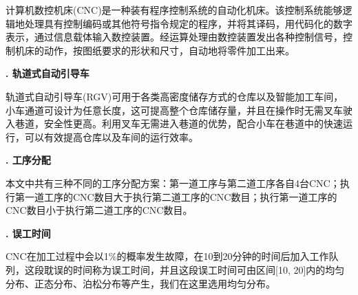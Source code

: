 \documentclass[no-math,withoutpreface,bwprint]{cumcmthesis} %
\numberwithin{equation}{section}
\numberwithin{figure}{section}
\numberwithin{table}{section}
\begin{document}
计算机数控机床(CNC)是一种装有程序控制系统的自动化机床。该控制系统能够逻辑地处理具有控制编码或其他符号指令规定的程序，并将其译码，用代码化的数字表示，通过信息载体输入数控装置。经运算处理由数控装置发出各种控制信号，控制机床的动作，按图纸要求的形状和尺寸，自动地将零件加工出来。

{\bfseries{}. 轨道式自动引导车 }

轨道式自动引导车(RGV)可用于各类高密度储存方式的仓库以及智能加工车间，小车通道可设计为任意长度，这可提高整个仓库储存量，并且在操作时无需叉车驶入巷道，安全性更高。利用叉车无需进入巷道的优势，配合小车在巷道中的快速运行，可以有效提高仓库以及车间的运行效率。

{\bfseries{}. 工序分配 }

本文中共有三种不同的工序分配方案：第一道工序与第二道工序各自4台CNC；执行第一道工序的CNC数目大于执行第二道工序的CNC数目；执行第一道工序的CNC数目小于执行第二道工序的CNC数目。

{\bfseries{}. 误工时间 }

CNC在加工过程中会以1\%的概率发生故障，在10到20分钟的时间后加入工作队列，这段耽误的时间称为误工时间，并且这段误工时间可由区间[10, 20]内的均匀分布、正态分布、泊松分布等产生，我们在这里选用均匀分布。
\end{document}
